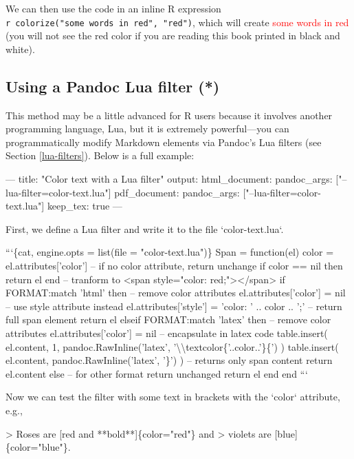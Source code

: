 \documentclass[
  11pt,
]{krantz}
\newenvironment{Shaded}{\begin{snugshade}}{\end{snugshade}}
\newcommand{\BaseNTok}[1]{\textcolor[rgb]{0.06,0.06,0.06}{#1}}
\newcommand{\DataTypeTok}[1]{\textcolor[rgb]{0.27,0.27,0.27}{#1}}
\newcommand{\NormalTok}[1]{#1}
\begin{document}
We can then use the code in an inline R expression \texttt{\textasciigrave{}r\ colorize("some\ words\ in\ red",\ "red")\textasciigrave{}}, which will create \textcolor{red}{some words in red} (you will not see the red color if you are reading this book printed in black and white).

\hypertarget{lua-color}{%
\subsection{Using a Pandoc Lua filter (*)}\label{lua-color}}

This method may be a little advanced for R users because it involves another programming language, Lua, but it is extremely powerful---you can programmatically modify Markdown elements via Pandoc's Lua filters (see Section \ref{lua-filters}). Below is a full example:

\begin{Shaded}
\begin{Highlighting}[]
\NormalTok{---}
\NormalTok{title: "Color text with a Lua filter"}
\NormalTok{output: }
\NormalTok{  html_document: }
\BaseNTok{    pandoc_args: ["--lua-filter=color-text.lua"]}
\NormalTok{  pdf_document: }
\BaseNTok{    pandoc_args: ["--lua-filter=color-text.lua"]}
\BaseNTok{    keep_tex: true}
\NormalTok{---}

\NormalTok{First, we define a Lua filter and write it to}
\NormalTok{the file }\BaseNTok{`color-text.lua`}\NormalTok{.}

\BaseNTok{```\{cat, engine.opts = list(file = "color-text.lua")\}}
\BaseNTok{Span = function(el)}
\BaseNTok{  color = el.attributes['color']}
\BaseNTok{  -- if no color attribute, return unchange}
\BaseNTok{  if color == nil then return el end}
\BaseNTok{  }
\BaseNTok{  -- tranform to <span style="color: red;"></span>}
\BaseNTok{  if FORMAT:match 'html' then}
\BaseNTok{    -- remove color attributes}
\BaseNTok{    el.attributes['color'] = nil}
\BaseNTok{    -- use style attribute instead}
\BaseNTok{    el.attributes['style'] = 'color: ' .. color .. ';'}
\BaseNTok{    -- return full span element}
\BaseNTok{    return el}
\BaseNTok{  elseif FORMAT:match 'latex' then}
\BaseNTok{    -- remove color attributes}
\BaseNTok{    el.attributes['color'] = nil}
\BaseNTok{    -- encapsulate in latex code}
\BaseNTok{    table.insert(}
\BaseNTok{      el.content, 1,}
\BaseNTok{      pandoc.RawInline('latex', '\textbackslash{}\textbackslash{}textcolor\{'..color..'\}\{')}
\BaseNTok{    )}
\BaseNTok{    table.insert(}
\BaseNTok{      el.content,}
\BaseNTok{      pandoc.RawInline('latex', '\}')}
\BaseNTok{    )}
\BaseNTok{    -- returns only span content}
\BaseNTok{    return el.content}
\BaseNTok{  else}
\BaseNTok{    -- for other format return unchanged}
\BaseNTok{    return el}
\BaseNTok{  end}
\BaseNTok{end}
\BaseNTok{```}

\NormalTok{Now we can test the filter with some text in brackets with}
\NormalTok{the }\BaseNTok{`color`}\NormalTok{ attribute, e.g.,}

\NormalTok{>}\DataTypeTok{ Roses are [red and **bold**]\{color="red"\} and}
\DataTypeTok{> violets are [blue]\{color="blue"\}.}
\end{Highlighting}
\end{Shaded}
\end{document}
